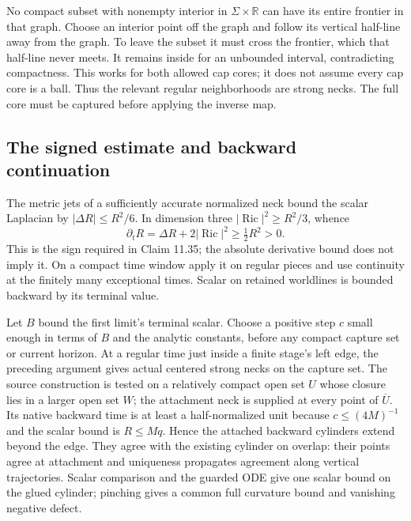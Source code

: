 No compact subset with nonempty interior in $\Sigma\times\mathbb R$
can have its entire frontier in that graph. Choose an interior point off
the graph and follow its vertical half-line away from the graph. To leave
the subset it must cross the frontier, which that half-line never meets.
It remains inside for an unbounded interval, contradicting compactness.
This works for both allowed cap cores; it does not assume every cap core
is a ball. Thus the relevant regular neighborhoods are strong necks.
The full core must be captured before applying the inverse map.

\subsection{The signed estimate and backward continuation}

The metric jets of a sufficiently accurate normalized neck bound
the scalar Laplacian by $|\Delta R|\leq R^2/6$. In dimension three
$|\operatorname{Ric}|^2\geq R^2/3$, whence
\begin{equation}
 \partial_tR=\Delta R+2|\operatorname{Ric}|^2\geq\tfrac12R^2>0.
 \label{eq:singular-positive-scalar-time}
\end{equation}
This is the sign required in Claim 11.35; the absolute derivative bound
does not imply it. On a compact time window apply it on regular pieces
and use continuity at the finitely many exceptional times. Scalar on
retained worldlines is bounded backward by its terminal value.

Let $B$ bound the first limit's terminal scalar. Choose a positive step
$c$ small enough in terms of $B$ and the analytic constants, before any
compact capture set or current horizon. At a regular time just inside
a finite stage's left edge, the preceding argument gives actual centered
strong necks on the capture set. The source construction is tested on a
relatively compact open set $U$ whose closure lies in a larger open set $W$; the
attachment neck is supplied at every point of $\overline U$. Its native
backward time is at least a half-normalized unit because
$c\leq(4M)^{-1}$ and the scalar bound is $R\leq Mq$. Hence the attached
backward cylinders extend beyond the edge. They agree with the existing
cylinder on overlap: their points agree at attachment and uniqueness
propagates agreement along vertical trajectories. Scalar comparison and the
guarded ODE give one scalar bound on the glued cylinder; pinching gives a
common full curvature bound and vanishing negative defect.


